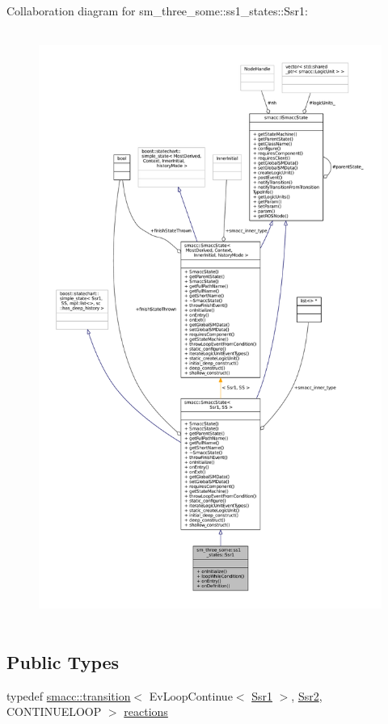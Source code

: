 Collaboration diagram for sm\+\_\+three\+\_\+some\+:\+:ss1\+\_\+states\+:\+:Ssr1\+:
\nopagebreak
\begin{figure}[H]
\begin{center}
\leavevmode
\includegraphics[height=550pt]{structsm__three__some_1_1ss1__states_1_1Ssr1__coll__graph}
\end{center}
\end{figure}
\subsection*{Public Types}
\begin{DoxyCompactItemize}
\item 
typedef \hyperlink{classsmacc_1_1transition}{smacc\+::transition}$<$ Ev\+Loop\+Continue$<$ \hyperlink{structsm__three__some_1_1ss1__states_1_1Ssr1}{Ssr1} $>$, \hyperlink{structsm__three__some_1_1ss1__states_1_1Ssr2}{Ssr2}, C\+O\+N\+T\+I\+N\+U\+E\+L\+O\+OP $>$ \hyperlink{structsm__three__some_1_1ss1__states_1_1Ssr1_a6f1fb945fa67b4db830cff041397fe56}{reactions}
\end{DoxyCompactItemize}
